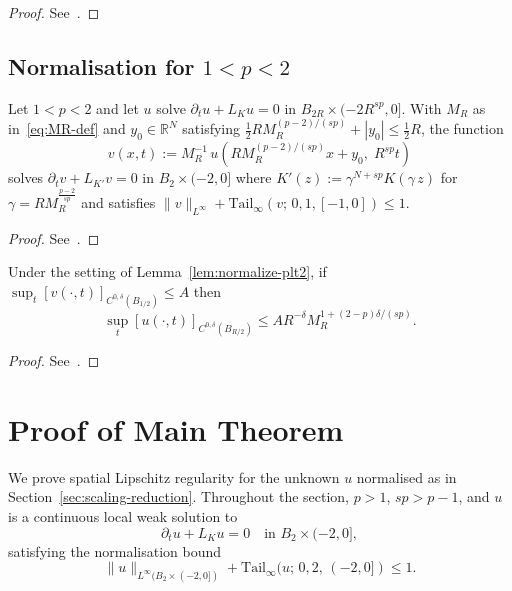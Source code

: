 \documentclass[11pt, a4paper, twoside]{article}
\theoremstyle{definition}
\theoremstyle{remark}
\newcommand{\R}{\mathbb{R}}
\begin{document}
\begin{proof}
See~\cite[p.~19]{BrascoLindgrenStromqvist2021}.
\end{proof}

\subsection*{Normalisation for $1 < p < 2$}

\begin{lemma}\label{lem:normalize-plt2}
Let $1 < p < 2$ and let $u$ solve $\partial_t u + L_K u = 0$
in $B_{2R} \times (-2R^{sp},0]$. With $M_R$
as in~\eqref{eq:MR-def}
and $y_0 \in \R^N$ satisfying
$\tfrac{1}{2}R M_R^{(p-2)/(sp)} + |y_0| \le \tfrac{1}{2}R$,
the function
\[
  v(x,t)
  := M_R^{-1}\,u\!\left(
       R M_R^{(p-2)/(sp)}x + y_0,\; R^{sp}t\right)
\]
solves $\partial_t v + L_{K'} v = 0$ in $B_2 \times (-2,0]$ where $K'(z) :=
  \gamma^{\!N+sp}
  K\!\left(\gamma\,z\right)$ for $\gamma = R M_R^{\frac{p-2}{sp}}$
and satisfies
$\|v\|_{L^\infty}
+ \mathrm{Tail}_\infty(v;\,0,1,[-1,0]) \le 1$.
\end{lemma}

\begin{proof}
See~\cite[p.~19]{GarainLindgrenTavakoli2025}.
\end{proof}

\begin{corollary}\label{cor:holder-transfer-plt2}
Under the setting of Lemma~\ref{lem:normalize-plt2}, if
$\sup_t [v(\cdot,t)]_{C^{0,\delta}(B_{1/2})} \le A$
then
\[\sup_t [u(\cdot,t)]_{C^{0,\delta}(B_{R/2})}
\le A R^{-\delta} M_R^{1+(2-p)\delta/(sp)}.\]
\end{corollary}

\begin{proof}
See~\cite[p.~19]{GarainLindgrenTavakoli2025}.
\end{proof}

\section{Proof of Main Theorem}
\label{sec:proofs}

We prove spatial Lipschitz regularity for the unknown $u$ normalised as in Section~\ref{sec:scaling-reduction}. Throughout the section, $p > 1$, $sp > p-1$, and $u$ is a continuous local weak solution to
\begin{equation}\label{eq:parabolic-homogeneous}
  \partial_t u + L_K u = 0 \quad \text{in } B_2 \times (-2, 0],
\end{equation}
satisfying the normalisation bound
\begin{equation}\label{eq:normalization-bound}
  \|u\|_{L^\infty(B_2 \times (-2,0])} + \mathrm{Tail}_\infty(u;\,0,2,\,(-2,0]) \le 1.
\end{equation}
\end{document}
